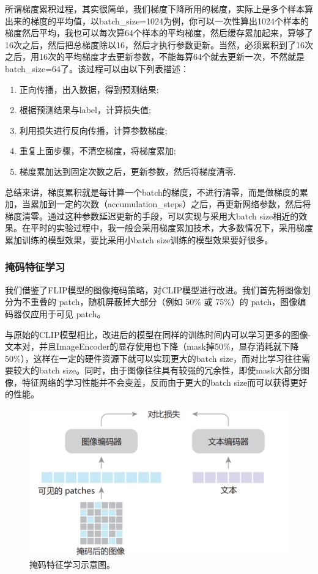 \documentclass[a4paper]{zreport}
\begin{document}
所谓梯度累积过程，其实很简单，我们梯度下降所用的梯度，实际上是多个样本算出来的梯度的平均值，以batch\_size=1024为例，你可以一次性算出1024个样本的梯度然后平均，我也可以每次算64个样本的平均梯度，然后缓存累加起来，算够了16次之后，然后把总梯度除以16，然后才执行参数更新。当然，必须累积到了16次之后，用16次的平均梯度才去更新参数，不能每算64个就去更新一次，不然就是batch\_size=64了。该过程可以由以下列表描述：

\begin{enumerate}
\item 正向传播，出入数据，得到预测结果;
\item 根据预测结果与label，计算损失值;
\item 利用损失进行反向传播，计算参数梯度;
\item 重复上面步骤，不清空梯度，将梯度累加;
\item 梯度累加达到固定次数之后，更新参数，然后将梯度清零.
\end{enumerate}

总结来讲，梯度累积就是每计算一个batch的梯度，不进行清零，而是做梯度的累加，当累加到一定的次数（accumulation\_steps）之后，再更新网络参数，然后将梯度清零。通过这种参数延迟更新的手段，可以实现与采用大batch size相近的效果。在平时的实验过程中，我一般会采用梯度累加技术，大多数情况下，采用梯度累加训练的模型效果，要比采用小batch size训练的模型效果要好很多。

\subsubsection{掩码特征学习}

我们借鉴了FLIP模型的图像掩码策略，对CLIP模型进行改进。我们首先将图像划分为不重叠的 patch，随机屏蔽掉大部分（例如 50\% 或 75\%）的 patch，图像编码器仅应用于可见 patch。

与原始的CLIP模型相比，改进后的模型在同样的训练时间内可以学习更多的图像-文本对，并且ImageEncoder的显存使用也下降（mask掉50\%，显存消耗就下降50\%），这样在一定的硬件资源下就可以实现更大的batch size，而对比学习往往需要较大的batch size。同时，由于图像往往具有较强的冗余性，即使mask大部分图像，特征网络的学习性能并不会变差，反而由于更大的batch size而可以获得更好的性能。

\begin{figure}[h]
\centering
\includegraphics[width=0.95\linewidth]{figures/mask}
\caption{掩码特征学习示意图。}
\label{fig:mask}
\end{figure}
\end{document}
